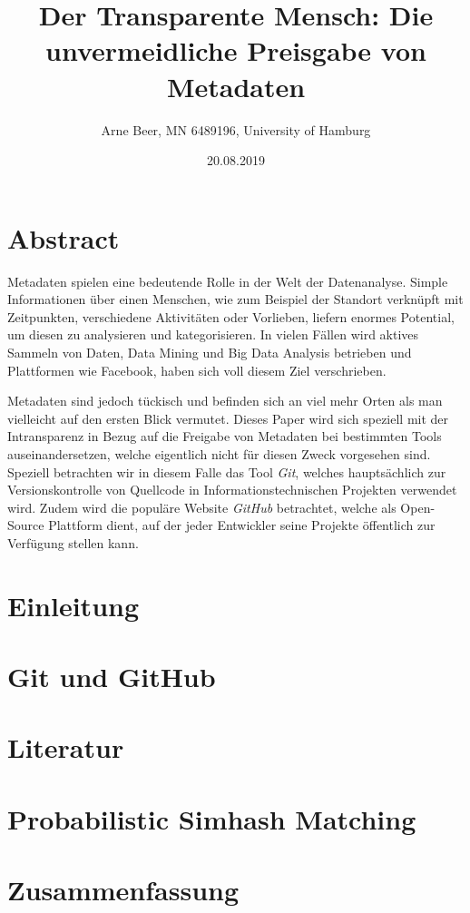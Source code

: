 \documentclass[12pt,a4paper]{scrartcl}
\begin{document}
\title{Der Transparente Mensch: Die unvermeidliche Preisgabe von Metadaten }
\author{Arne Beer, MN 6489196, University of Hamburg}
\date{20.08.2019}

\maketitle


\section{Abstract}

Metadaten spielen eine bedeutende Rolle in der Welt der Datenanalyse.
Simple Informationen über einen Menschen, wie zum Beispiel der Standort verknüpft mit Zeitpunkten, verschiedene Aktivitäten oder Vorlieben, liefern enormes Potential, um diesen zu analysieren und kategorisieren.
In vielen Fällen wird aktives Sammeln von Daten, Data Mining und Big Data Analysis betrieben und Plattformen wie Facebook, haben sich voll diesem Ziel verschrieben.

Metadaten sind jedoch tückisch und befinden sich an viel mehr Orten als man vielleicht auf den ersten Blick vermutet.
Dieses Paper wird sich speziell mit der Intransparenz in Bezug auf die Freigabe von Metadaten bei bestimmten Tools auseinandersetzen, welche eigentlich nicht für diesen Zweck vorgesehen sind.
Speziell betrachten wir in diesem Falle das Tool \emph{Git}, welches hauptsächlich zur Versionskontrolle von Quellcode in Informationstechnischen Projekten verwendet wird.
Zudem wird die populäre Website \emph{GitHub} betrachtet, welche als Open-Source Plattform dient, auf der jeder Entwickler seine Projekte öffentlich zur Verfügung stellen kann.

\section{Einleitung}

\section{Git und GitHub}

\section{Literatur}

\section{Probabilistic Simhash Matching}



\section{Zusammenfassung}

\printbibliography
\end{document}
